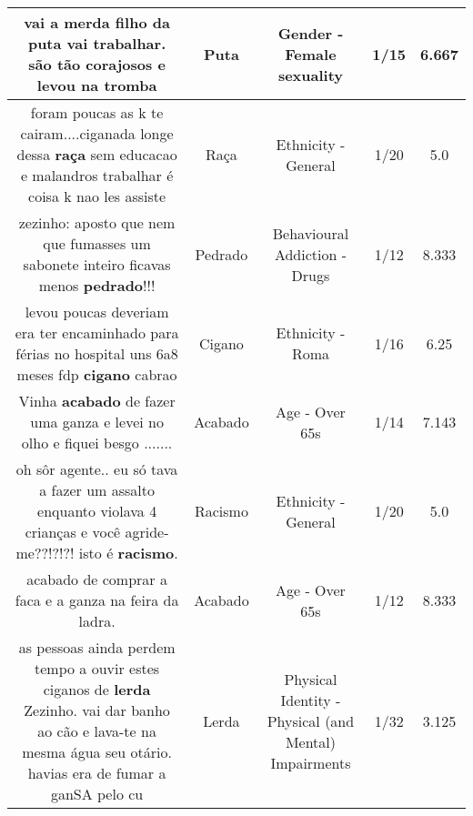 \documentclass[11pt]{article}
\newlength\mylength
\begin{document}
\begin{center}
\begin{longtable}{|C{.65\mylength}|C{.30\mylength}|C{.12\mylength}|C{.12\mylength}|C{.12\mylength}|}
  \small vai a merda filho da \textbf{puta} vai trabalhar. são tão corajosos e levou na tromba\normalsize   & Puta & Gender - Female sexuality & 1/15 & 6.667 \\  \hline
  \small foram poucas as k te cairam....ciganada longe dessa \textbf{raça}  sem educacao  e malandros trabalhar é coisa k nao les assiste\normalsize   & Raça & Ethnicity - General & 1/20 & 5.0 \\  \hline
  \small zezinho: aposto que nem que fumasses um sabonete inteiro ficavas menos \textbf{pedrado}!!!\normalsize   & Pedrado & Behavioural Addiction - Drugs & 1/12 & 8.333 \\  \hline
  \small levou poucas deveriam era ter encaminhado para férias no hospital uns 6a8 meses fdp \textbf{cigano} cabrao\normalsize   & Cigano & Ethnicity - Roma & 1/16 & 6.25 \\  \hline
  \small Vinha \textbf{acabado} de fazer uma ganza e levei no olho e fiquei besgo .......\normalsize   & Acabado & Age - Over 65s & 1/14 & 7.143 \\  \hline
  \small oh sôr agente.. eu só tava a fazer um assalto enquanto violava 4 crianças e você agride-me??!?!?! isto é \textbf{racismo}.\normalsize   & Racismo & Ethnicity - General & 1/20 & 5.0 \\  \hline
  \small acabado de comprar a faca e a ganza na feira da ladra.\normalsize   & Acabado & Age - Over 65s & 1/12 & 8.333 \\  \hline
  \small as pessoas ainda perdem tempo a ouvir estes ciganos de \textbf{lerda} Zezinho. vai dar banho ao cão e lava-te na mesma água seu otário. havias era de fumar a ganSA pelo cu\normalsize   & Lerda & Physical Identity - Physical (and Mental) Impairments & 1/32 & 3.125 \\  \hline

\end{longtable}
\end{center}
\end{document}
